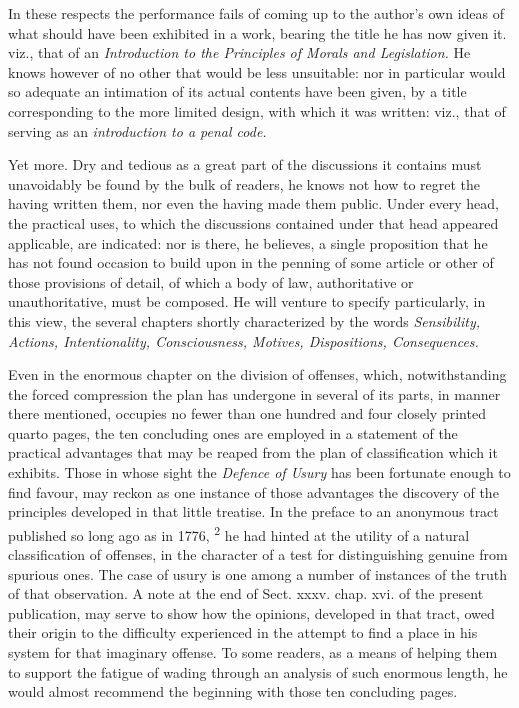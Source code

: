 \documentclass[12pt]{report}
\begin{document}
In these respects the performance fails of coming up to the author's own
ideas of what should have been exhibited in a work, bearing the title he
has now given it. viz., that of an \emph{Introduction to the Principles
of Morals and Legislation.} He knows however of no other that would be
less unsuitable: nor in particular would so adequate an intimation of
its actual contents have been given, by a title corresponding to the
more limited design, with which it was written: viz., that of serving as
an \emph{introduction to a penal code.} \emph{}

Yet more. Dry and tedious as a great part of the discussions it contains
must unavoidably be found by the bulk of readers, he knows not how to
regret the having written them, nor even the having made them public.
Under every head, the practical uses, to which the discussions contained
under that head appeared applicable, are indicated: nor is there, he
believes, a single proposition that he has not found occasion to build
upon in the penning of some article or other of those provisions of
detail, of which a body of law, authoritative or unauthoritative, must
be composed. He will venture to specify particularly, in this view, the
several chapters shortly characterized by the words \emph{Sensibility,
Actions, Intentionality, Consciousness, Motives, Dispositions,
Consequences.} \emph{}

Even in the enormous chapter on the division of offenses, which,
notwithstanding the forced compression the plan has undergone in several
of its parts, in manner there mentioned, occupies no fewer than one
hundred and four closely printed quarto pages, the ten concluding ones
are employed in a statement of the practical advantages that may be
reaped from the plan of classification which it exhibits. Those in whose
sight the \emph{Defence of Usury} has been fortunate enough to find
favour, may reckon as one instance of those advantages the discovery of
the principles developed in that little treatise. In the preface to an
anonymous tract published so long ago as in 1776, \textsuperscript{2} he
had hinted at the utility of a natural classification of offenses, in
the character of a test for distinguishing genuine from spurious ones.
The case of usury is one among a number of instances of the truth of
that observation. A note at the end of Sect. xxxv. chap. xvi. of the
present publication, may serve to show how the opinions, developed in
that tract, owed their origin to the difficulty experienced in the
attempt to find a place in his system for that imaginary offense. To
some readers, as a means of helping them to support the fatigue of
wading through an analysis of such enormous length, he would almost
recommend the beginning with those ten concluding pages.
\end{document}
